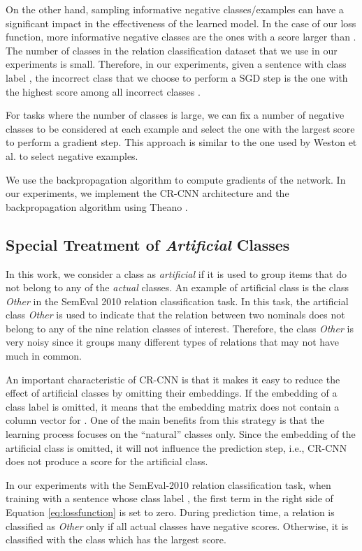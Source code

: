 \documentclass[11pt]{article}
\begin{document}
On the other hand,
sampling informative negative classes/examples can have a significant impact in the effectiveness of the learned model.
In the case of our loss function,
more informative negative classes are the ones with a score larger than .
The number of classes in the relation classification dataset that we use in our experiments is small.
Therefore,
in our experiments,
given a sentence  with class label ,
the incorrect class  that we choose to perform a SGD step is the one with the highest score among all incorrect classes  .

For tasks where the number of classes is large,
we can fix a number of negative classes to be considered at each example and select the one with the largest score to perform a gradient step.
This approach is similar to the one used by Weston et al.  to select negative examples.

We use the backpropagation algorithm to compute gradients of the network.
In our experiments, 
we implement the CR-CNN architecture and the backpropagation algorithm using Theano \cite{bergstra:scipy2010}.

\subsection{Special Treatment of \emph{Artificial} Classes}
\label{sec:omitting_classes}
In this work,
we consider a class as \emph{artificial} if it is used to group items that do not belong to any of the \emph{actual} classes.
An example of artificial class is the class \emph{Other} in the SemEval 2010 relation classification task.
In this task,
the artificial class \emph{Other} is used to indicate that the relation between two nominals does not belong to any of the nine relation classes of interest.
Therefore,
the class \emph{Other} is very noisy since it groups many different types of relations that may not have much in common. 

An important characteristic of CR-CNN is that it makes it easy to reduce the effect of artificial classes by omitting their embeddings.
If the embedding of a class label  is omitted,
it means that the embedding matrix  does not contain a column vector for .
One of the main benefits from this strategy is that the learning process focuses on the ``natural'' classes only. Since the embedding of the artificial class is omitted, 
it will not influence the prediction step, 
i.e., 
CR-CNN does not produce a score for the artificial class.

In our experiments with the SemEval-2010 relation classification task,
when training with a sentence  whose class label ,
the first term in the right side of Equation \ref{eq:lossfunction} is set to zero.
During prediction time,
a relation is classified as \emph{Other} only if all actual classes have negative scores.
Otherwise, 
it is classified with the class which has the largest score.
\end{document}
